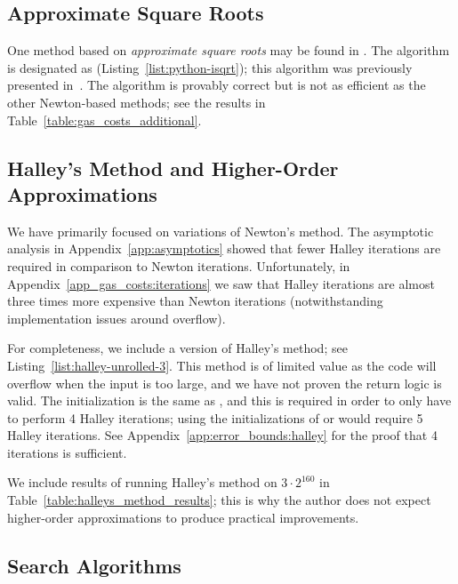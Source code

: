 \subsection{Approximate Square Roots}

One method based on \emph{approximate square roots}
may be found in \cite{PythonIsqrt}.
The algorithm is designated as
\python{} (Listing~\ref{list:python-isqrt});
this algorithm was previously presented in~\cite{EfficientIsqrt}.
The algorithm is provably correct
but is not as efficient as the other Newton-based methods;
see the results in Table~\ref{table:gas_costs_additional}.




\subsection{Halley's Method and Higher-Order Approximations}
\label{app_additional_algs:halley}

We have primarily focused on variations of Newton's method.
The asymptotic analysis in Appendix~\ref{app:asymptotics}
showed that fewer Halley iterations are required
in comparison to Newton iterations.
Unfortunately, in Appendix~\ref{app_gas_costs:iterations}
we saw that Halley iterations are almost three times more expensive
than Newton iterations
(notwithstanding implementation issues around overflow).

For completeness, we include a version of Halley's method;
see Listing~\ref{list:halley-unrolled-3}.
This method is of limited value as the code will overflow
when the input is too large,
and we have not proven the return logic is valid.
The initialization is the same as \WhileThree{},
and this is required in order to only have to perform 4 Halley iterations;
using the initializations of \UnrolledOne{} or \UnrolledTwo{}
would require 5 Halley iterations.
See Appendix~\ref{app:error_bounds:halley}
for the proof that 4 iterations is sufficient.

We include results of running Halley's method on $3\cdot2^{160}$ in
Table~\ref{table:halleys_method_results};
this is why the author
does not expect higher-order approximations
to produce practical improvements.





\subsection{Search Algorithms}

